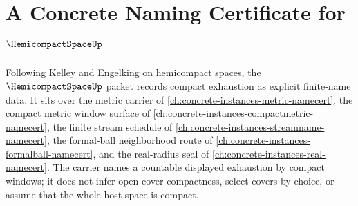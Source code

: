 \chapter{A Concrete Naming Certificate for $\HemicompactSpaceUp$}
\label{ch:concrete-instances-hemicompact-space-namecert}

Following Kelley and Engelking on hemicompact spaces, the $\HemicompactSpaceUp$ packet records compact exhaustion as explicit finite-name data. It sits over the metric carrier of \autoref{ch:concrete-instances-metric-namecert}, the compact metric window surface of \autoref{ch:concrete-instances-compactmetric-namecert}, the finite stream schedule of \autoref{ch:concrete-instances-streamname-namecert}, the formal-ball neighborhood route of \autoref{ch:concrete-instances-formalball-namecert}, and the real-radius seal of \autoref{ch:concrete-instances-real-namecert}. The carrier names a countable displayed exhaustion by compact windows; it does not infer open-cover compactness, select covers by choice, or assume that the whole host space is compact.

